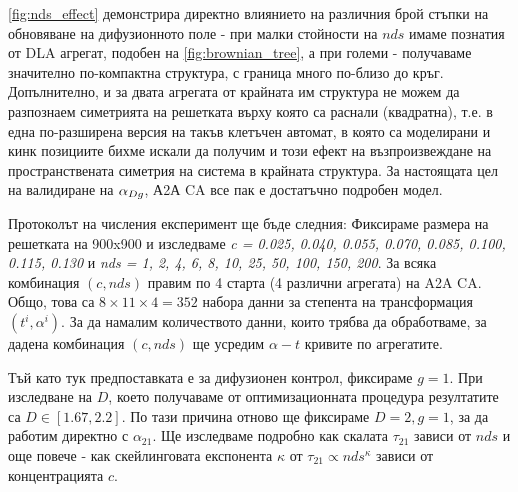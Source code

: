 \autoref{fig:nds_effect} демонстрира директно влиянието на различния брой стъпки на обновяване на дифузионното поле - при малки стойности на $nds$ имаме познатия от DLA агрегат, подобен на \autoref{fig:brownian_tree}, а при големи - получаваме значително по-компактна структура, с граница много по-близо до кръг. Допълнително, и за двата агрегата от крайната им структура не можем да разпознаем симетрията на решетката върху която са раснали (квадратна), т.е. в една по-разширена версия на такъв клетъчен автомат, в която са моделирани и кинк позициите бихме искали да получим и този ефект на възпроизвеждане на пространствената симетрия на система в крайната структура. За настоящата цел на валидиране на $\alpha_{Dg}$, А2А CA все пак е достатъчно подробен модел.

Протоколът на числения експеримент ще бъде следния: Фиксираме размера на решетката на 900x900 и изследваме \textit{c = 0.025, 0.040, 0.055, 0.070, 0.085, 0.100, 0.115, 0.130} и \textit{nds = 1, 2, 4, 6, 8, 10, 25, 50, 100, 150, 200}. За всяка комбинация $(c, nds)$ правим по 4 старта (4 различни агрегата) на A2A CA. Общо, това са $8 \times 11 \times 4  = 352$ набора данни за степента на трансформация $(t^i, \alpha^i)$. За да намалим количеството данни, които трябва да обработваме, за дадена комбинация $(c, nds)$ ще усредим $\alpha - t$ кривите по агрегатите.

Тъй като тук предпоставката е за дифузионен контрол, фиксираме $g = 1$. При изследване на $D$, което получаваме от оптимизационната процедура резултатите са $D \in [1.67, 2.2]$. По тази причина отново ще фиксираме $D = 2, g = 1$, за да работим директно с $\alpha_{21}$. Ще изследваме подробно как скалата $\tau_{21}$ зависи от $nds$ и още повече - как скейлинговата експонента $\kappa$ от $\tau_{21} \propto nds^\kappa$ зависи от концентрацията $c$.

